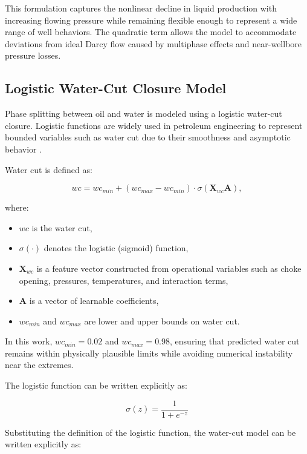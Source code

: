 \documentclass[12pt,APA]{uomthesis}
\begin{document}
This formulation captures the nonlinear decline in liquid production with increasing flowing pressure while remaining flexible enough to represent a wide range of well behaviors. The quadratic term allows the model to accommodate deviations from ideal Darcy flow caused by multiphase effects and near-wellbore pressure losses.

\subsection{Logistic Water-Cut Closure Model}
\label{subsec:wc_closure}
Phase splitting between oil and water is modeled using a logistic water-cut closure. Logistic functions are widely used in petroleum engineering to represent bounded variables such as water cut due to their smoothness and asymptotic behavior \citep{hastie2009elements}.

Water cut is defined as:

\begin{equation}
wc = wc_{min} + (wc_{max} - wc_{min}) \cdot \sigma\left(\mathbf{X}_{wc} \mathbf{A}\right),
\end{equation}

where:
\begin{itemize}
    \item $wc$ is the water cut,
    \item $\sigma(\cdot)$ denotes the logistic (sigmoid) function,
    \item $\mathbf{X}_{wc}$ is a feature vector constructed from operational variables such as choke opening, pressures, temperatures, and interaction terms,
    \item $\mathbf{A}$ is a vector of learnable coefficients,
    \item $wc_{min}$ and $wc_{max}$ are lower and upper bounds on water cut.
\end{itemize}

In this work, $wc_{min} = 0.02$ and $wc_{max} = 0.98$, ensuring that predicted water cut remains within physically plausible limits while avoiding numerical instability near the extremes.

The logistic function can be written explicitly as:

\begin{equation}
\sigma(z) = \frac{1}{1 + e^{-z}}
\end{equation}

Substituting the definition of the logistic function, the water-cut model can be written explicitly as:
\end{document}
